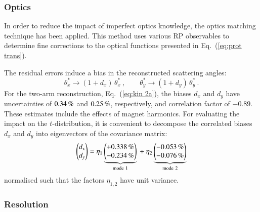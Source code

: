 


\subsubsection{Optics}
\label{sec:optics}
In order to reduce the impact of imperfect optics knowledge, the optics matching technique \cite{totem-optics} has been applied. This method uses various RP observables to determine fine corrections to the optical functions presented in Eq.~(\ref{eq:prot trans}).

The residual errors induce a bias in the reconstructed scattering angles:
\begin{equation}
\label{eq:opt bias}
	\theta_x^* \rightarrow (1 + d_x)\, \theta_x^*\ ,\qquad
	\theta_y^* \rightarrow (1 + d_y)\, \theta_y^*\ .
\end{equation}
For the two-arm reconstruction, Eq.~(\ref{eq:kin 2a}), the biases $d_x$ and $d_y$ have uncertainties of $0.34\,{\rm \%}$ and $0.25\,{\rm \%}$, respectively, and correlation factor of $-0.89$. These estimates include the effects of magnet harmonics. For evaluating the impact on the $t$-distribution, it is convenient to decompose the correlated biases $d_x$ and $d_y$ into eigenvectors of the covariance matrix:
\begin{equation}
\label{eq:opt bias modes}
\begin{pmatrix} d_x\cr d_y \end{pmatrix} =
	\eta_1 \underbrace{\begin{pmatrix} +0.338\,{\rm \%} \cr -0.234\,{\rm \%} \end{pmatrix}}_{\rm mode\ 1}
	\ +\ \eta_2 \underbrace{\begin{pmatrix} -0.053\,{\rm \%} \cr -0.076\,{\rm \%} \end{pmatrix}}_{\rm mode\ 2}
\end{equation}
normalised such that the factors $\eta_{1,2}$ have unit variance.



\subsubsection{Resolution}
\label{sec:resolution}

